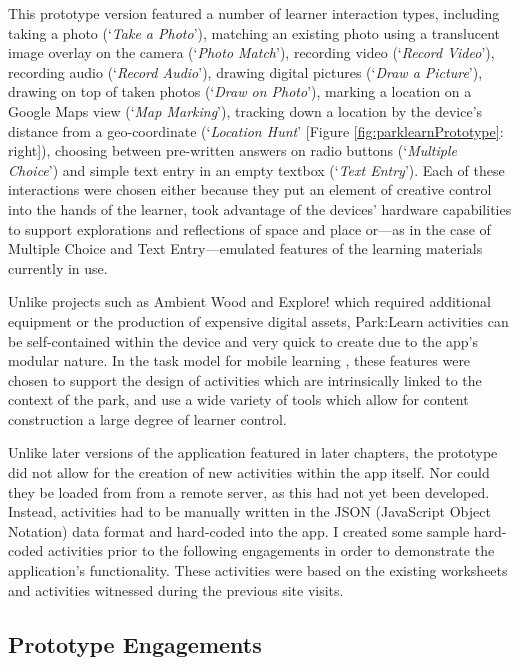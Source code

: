 This prototype version featured a number of learner interaction types, including taking a photo (`\textit{Take a Photo}'), matching an existing photo using a translucent image overlay on the camera (`\textit{Photo Match}'), recording video (`\textit{Record Video}'), recording audio (`\textit{Record Audio}'), drawing digital pictures (`\textit{Draw a Picture}'), drawing on top of taken photos (`\textit{Draw on Photo}'), marking a location on a Google Maps view (`\textit{Map Marking}'), tracking down a location by the device’s distance from a geo-coordinate (`\textit{Location Hunt}' [Figure \ref{fig:parklearnPrototype}: right]), choosing between pre-written answers on radio buttons (`\textit{Multiple Choice}') and simple text entry in an empty textbox (`\textit{Text Entry}'). Each of these interactions were chosen either because they put an element of creative control into the hands of the learner, took advantage of the devices’ hardware capabilities to support explorations and reflections of space and place or---as in the case of Multiple Choice and Text Entry---emulated features of the learning materials currently in use. 

Unlike projects such as Ambient Wood \citep{Rogers2004} and Explore! \citep{Costabile2008} which required additional equipment or the production of expensive digital assets, Park:Learn activities can be self-contained within the device and very quick to create due to the app’s modular nature. In the task model for mobile learning \citep{Sharples2013}, these features were chosen to support the design of activities which are intrinsically linked to the context of the park, and use a wide variety of tools which allow for content construction a large degree of learner control.

Unlike later versions of the application featured in later chapters, the prototype did not allow for the creation of new activities within the app itself. Nor could they be loaded from from a remote server, as this had not yet been developed. Instead, activities had to be manually written in the JSON (JavaScript Object Notation) data format and hard-coded into the app. I created some sample hard-coded activities prior to the following engagements in order to demonstrate the application's functionality. These activities were based on the existing worksheets and activities witnessed during the previous site visits.

\subsection{Prototype Engagements}

